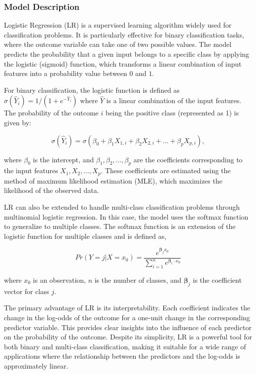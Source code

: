\documentclass[
  letterpaper,
  DIV=11,
  numbers=noendperiod]{scrartcl}
\begin{document}
\subsubsection{Model Description}\label{model-description-3}

Logistic Regression (LR) is a supervised learning algorithm widely used
for classification problems. It is particularly effective for binary
classification tasks, where the outcome variable can take one of two
possible values. The model predicts the probability that a given input
belongs to a specific class by applying the logistic (sigmoid) function,
which transforms a linear combination of input features into a
probability value between \(0\) and \(1\).

For binary classification, the logistic function is defined as
\(\sigma(\hat{Y}_i) = 1/(1 + e^{-\hat{Y}_i})\) where \(\hat{Y}\) is a
linear combination of the input features. The probability of the outcome
\(i\) being the positive class (represented as 1) is given by:

\[\sigma(\hat{Y}_i) = \sigma(\beta_0 + \beta_1 X_{1, i} + \beta_2 X_{2, i} + \ldots + \beta_p X_{p, i}),\]

where \(\beta_0\) is the intercept, and
\(\beta_1, \beta_2, \ldots, \beta_p\) are the coefficients corresponding
to the input features \(X_1, X_2, \ldots, X_p\). These coefficients are
estimated using the method of maximum likelihood estimation (MLE), which
maximizes the likelihood of the observed data.

LR can also be extended to handle multi-class classification problems
through multinomial logistic regression. In this case, the model uses
the softmax function to generalize to multiple classes. The softmax
function is an extension of the logistic function for multiple classes
and is defined as,

\[Pr(Y = j | X = x_0) = \frac{e^{\mathbf{\beta}_j x_0}}{\sum_{i=1}^{n} e^{\mathbf{\beta}_i \cdot x_0}}\]

where \(x_0\) is an observation, \(n\) is the number of classes, and
\(\mathbf{\beta}_j\) is the coefficient vector for class \(j\).

The primary advantage of LR is its interpretability. Each coefficient
indicates the change in the log-odds of the outcome for a one-unit
change in the corresponding predictor variable. This provides clear
insights into the influence of each predictor on the probability of the
outcome. Despite its simplicity, LR is a powerful tool for both binary
and multi-class classification, making it suitable for a wide range of
applications where the relationship between the predictors and the
log-odds is approximately linear.
\end{document}
